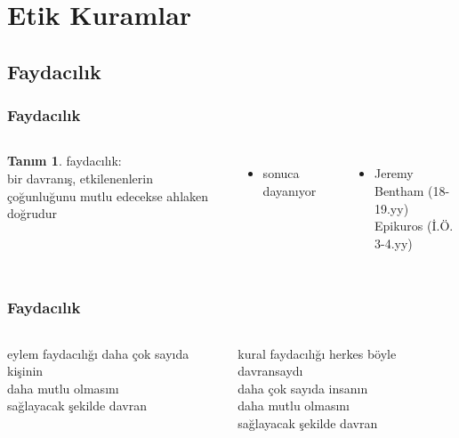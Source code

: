 \documentclass[dvipsnames]{beamer}
\theoremstyle{definition}
\newtheorem{tanim}[theorem]{Tanım}
\theoremstyle{example}
\theoremstyle{plain}
\begin{document}
\section{Etik Kuramlar}

\subsection{Faydacılık}

\begin{frame}
  \frametitle{Faydacılık}

  \begin{columns}
    \begin{tanim}
      \alert{faydacılık}:\\
      bir davranış, etkilenenlerin çoğunluğunu mutlu edecekse ahlaken doğrudur
    \end{tanim}

    \begin{itemize}
      \item sonuca dayanıyor
    \end{itemize}

    \begin{center}
    \end{center}
    \begin{itemize}
      \item Jeremy Bentham (18-19.yy)\\
        Epikuros (İ.Ö. 3-4.yy)
    \end{itemize}
  \end{columns}
\end{frame}

\begin{frame}
  \frametitle{Faydacılık}

  \begin{columns}[t]
    \begin{block}{eylem faydacılığı}
      daha çok sayıda kişinin\\
      daha mutlu olmasını\\
      sağlayacak şekilde davran
    \end{block}

    \pause
    \begin{block}{kural faydacılığı}
      herkes böyle davransaydı\\
      daha çok sayıda insanın\\
      daha mutlu olmasını\\
      sağlayacak şekilde davran
    \end{block}
  \end{columns}
\end{frame}
\end{document}
